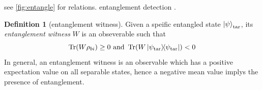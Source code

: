 \documentclass[
reprint,
aps,
pra,
floatfix,
]{revtex4-2}
\theoremstyle{plain}
\theoremstyle{definition}
\newtheorem{definition}{Definition}
\newcommand{\ew}{W}
\newcommand{\ob}{O}
\newcommand{\target}{\textup{tar}}
\newcommand{\dm}{\rho}
\begin{document}
see \cref{fig:entangle} for relations.
entanglement detection \cite{guhneEntanglementDetection2009}.
\begin{definition}[entanglement witness]\label{def:entanglement_witness}
	Given a speific entangled state $\ket{\psi}_{\target}$, its \emph{entanglement witness} $\ew$ is an obseverable such that
	\begin{equation}
		\Tr(\ew\dm_{bi}) \ge 0  \text{ and }
		\Tr(\ew\op{\psi_{\target}}) < 0 
	\end{equation}
	In general, an entanglement witness is an observable which has a positive expectation value on all separable states, hence a negative mean value implys the presence of entanglement.
\end{definition}
\end{document}
